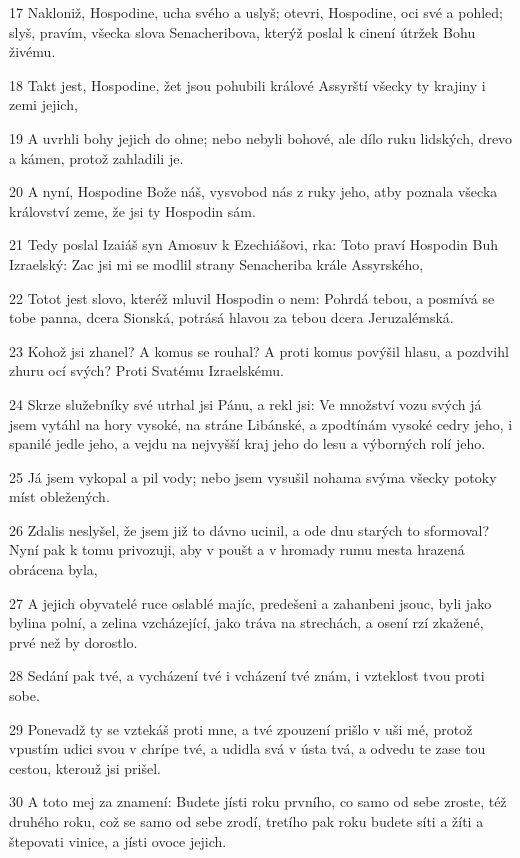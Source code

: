 \par 17 Nakloniž, Hospodine, ucha svého a uslyš; otevri, Hospodine, oci své a pohled; slyš, pravím, všecka slova Senacheribova, kterýž poslal k cinení útržek Bohu živému.
\par 18 Takt jest, Hospodine, žet jsou pohubili králové Assyrští všecky ty krajiny i zemi jejich,
\par 19 A uvrhli bohy jejich do ohne; nebo nebyli bohové, ale dílo ruku lidských, drevo a kámen, protož zahladili je.
\par 20 A nyní, Hospodine Bože náš, vysvobod nás z ruky jeho, atby poznala všecka království zeme, že jsi ty Hospodin sám.
\par 21 Tedy poslal Izaiáš syn Amosuv k Ezechiášovi, rka: Toto praví Hospodin Buh Izraelský: Zac jsi mi se modlil strany Senacheriba krále Assyrského,
\par 22 Totot jest slovo, kteréž mluvil Hospodin o nem: Pohrdá tebou, a posmívá se tobe panna, dcera Sionská, potrásá hlavou za tebou dcera Jeruzalémská.
\par 23 Kohož jsi zhanel? A komus se rouhal? A proti komus povýšil hlasu, a pozdvihl zhuru ocí svých? Proti Svatému Izraelskému.
\par 24 Skrze služebníky své utrhal jsi Pánu, a rekl jsi: Ve množství vozu svých já jsem vytáhl na hory vysoké, na stráne Libánské, a zpodtínám vysoké cedry jeho, i spanilé jedle jeho, a vejdu na nejvyšší kraj jeho do lesu a výborných rolí jeho.
\par 25 Já jsem vykopal a pil vody; nebo jsem vysušil nohama svýma všecky potoky míst obležených.
\par 26 Zdalis neslyšel, že jsem již to dávno ucinil, a ode dnu starých to sformoval? Nyní pak k tomu privozuji, aby v poušt a v hromady rumu mesta hrazená obrácena byla,
\par 27 A jejich obyvatelé ruce oslablé majíc, predešeni a zahanbeni jsouc, byli jako bylina polní, a zelina vzcházející, jako tráva na strechách, a osení rzí zkažené, prvé než by dorostlo.
\par 28 Sedání pak tvé, a vycházení tvé i vcházení tvé znám, i vzteklost tvou proti sobe.
\par 29 Ponevadž ty se vztekáš proti mne, a tvé zpouzení prišlo v uši mé, protož vpustím udici svou v chrípe tvé, a udidla svá v ústa tvá, a odvedu te zase tou cestou, kterouž jsi prišel.
\par 30 A toto mej za znamení: Budete jísti roku prvního, co samo od sebe zroste, též druhého roku, což se samo od sebe zrodí, tretího pak roku budete síti a žíti a štepovati vinice, a jísti ovoce jejich.
